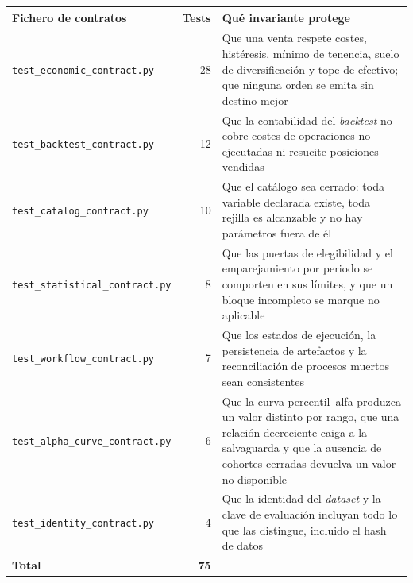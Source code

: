 \begin{tabularx}{\textwidth}{lrX}
\toprule
Fichero de contratos & Tests & Qué invariante protege \\
\midrule
\texttt{test\_economic\_contract.py} & 28 &
Que una venta respete costes, histéresis, mínimo de tenencia, suelo de diversificación y tope de
efectivo; que ninguna orden se emita sin destino mejor \\
\addlinespace
\texttt{test\_backtest\_contract.py} & 12 &
Que la contabilidad del \textit{backtest} no cobre costes de operaciones no ejecutadas ni resucite
posiciones vendidas \\
\addlinespace
\texttt{test\_catalog\_contract.py} & 10 &
Que el catálogo sea cerrado: toda variable declarada existe, toda rejilla es alcanzable y no hay
parámetros fuera de él \\
\addlinespace
\texttt{test\_statistical\_contract.py} & 8 &
Que las puertas de elegibilidad y el emparejamiento por periodo se comporten en sus límites, y que
un bloque incompleto se marque no aplicable \\
\addlinespace
\texttt{test\_workflow\_contract.py} & 7 &
Que los estados de ejecución, la persistencia de artefactos y la reconciliación de procesos muertos
sean consistentes \\
\addlinespace
\texttt{test\_alpha\_curve\_contract.py} & 6 &
Que la curva percentil--alfa produzca un valor distinto por rango, que una relación decreciente
caiga a la salvaguarda y que la ausencia de cohortes cerradas devuelva un valor no disponible \\
\addlinespace
\texttt{test\_identity\_contract.py} & 4 &
Que la identidad del \textit{dataset} y la clave de evaluación incluyan todo lo que las distingue,
incluido el hash de datos \\
\midrule
\textbf{Total} & \textbf{75} & \\
\bottomrule
\end{tabularx}
